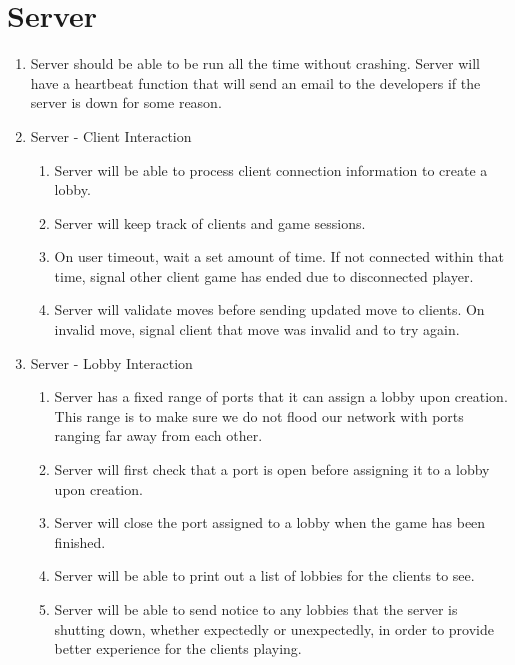 \documentclass{scrreprt}
\begin{document}
\section{Server}

\begin{enumerate}[resume*]
    \item Server should be able to be run all the time without crashing.
        \subitem Server will have a heartbeat function that will send an email to the developers if the server is down for some reason.
    \item Server - Client Interaction
    \begin{enumerate}[label*=\arabic*.]
        \item Server will be able to process client connection information to create a lobby.
        \item Server will keep track of clients and game sessions.
        \item On user timeout, wait a set amount of time.
            \subitem If not connected within that time, signal other client game has ended due to disconnected player.
        \item Server will validate moves before sending updated move to clients.
            \subitem On invalid move, signal client that move was invalid and to try again.
    \end{enumerate}
    \item Server - Lobby Interaction
    \begin{enumerate}[label*=\arabic*.]
        \item Server has a fixed range of ports that it can assign a lobby upon creation. This range is to make sure we do not flood our network with ports ranging far away from each other.
        \item Server will first check that a port is open before assigning it to a lobby upon creation.
        \item Server will close the port assigned to a lobby when the game has been finished.
        \item Server will be able to print out a list of lobbies for the clients to see.
        \item Server will be able to send notice to any lobbies that the server is shutting down, whether expectedly or unexpectedly, in order to provide better experience for the clients playing.   
    \end{enumerate}
\end{enumerate}
\end{document}
